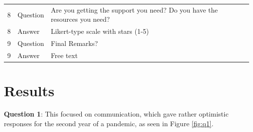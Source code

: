 \documentclass[paper=a4,justified,a4paper]{tufte-handout}
\begin{document}
\begin{longtable}[]{@{}lll@{}}
\begin{minipage}[t]{0.09\columnwidth}\raggedright
8\strut
\end{minipage} & \begin{minipage}[t]{0.14\columnwidth}\raggedright
Question\strut
\end{minipage} & \begin{minipage}[t]{0.68\columnwidth}\raggedright
Are you getting the support you need? Do you have the resources you
need?\strut
\end{minipage}\tabularnewline
\begin{minipage}[t]{0.09\columnwidth}\raggedright
8\strut
\end{minipage} & \begin{minipage}[t]{0.14\columnwidth}\raggedright
Answer\strut
\end{minipage} & \begin{minipage}[t]{0.68\columnwidth}\raggedright
Likert-type scale with stars (1-5)\strut
\end{minipage}\tabularnewline
\begin{minipage}[t]{0.09\columnwidth}\raggedright
9\strut
\end{minipage} & \begin{minipage}[t]{0.14\columnwidth}\raggedright
Question\strut
\end{minipage} & \begin{minipage}[t]{0.68\columnwidth}\raggedright
Final Remarks?\strut
\end{minipage}\tabularnewline
\begin{minipage}[t]{0.09\columnwidth}\raggedright
9\strut
\end{minipage} & \begin{minipage}[t]{0.14\columnwidth}\raggedright
Answer\strut
\end{minipage} & \begin{minipage}[t]{0.68\columnwidth}\raggedright
Free text\strut
\end{minipage}\tabularnewline
\bottomrule
\end{longtable}

\hypertarget{results}{%
\section{Results}\label{results}}

\textbf{Question 1}: This focused on communication, which gave rather
optimistic responses for the second year of a pandemic, as seen in
Figure \ref{fig:q1}.
\end{document}
